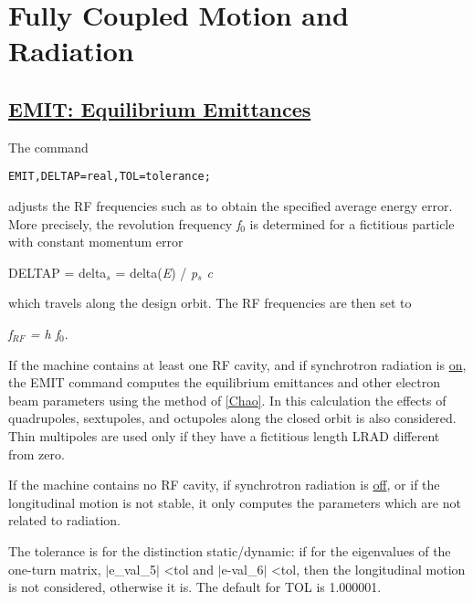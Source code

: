 





\section{Fully Coupled Motion and Radiation}

\subsection{\href{emit}{EMIT: Equilibrium Emittances}} The command 
\begin{verbatim}
EMIT,DELTAP=real,TOL=tolerance;
\end{verbatim} adjusts the RF frequencies such as to obtain the specified average energy error. More precisely, the revolution frequency \textit{f$_0$} is determined for a fictitious particle with constant momentum error 

 DELTAP = delta$_\textit{s}$ = delta(\textit{E}) / \textit{p$_s$ c}

 which travels along the design orbit. The RF frequencies are then set to 

\textit{f$_{RF}$ = h f$_0$}. 

 If the machine contains at least one RF cavity, and if synchrotron radiation is \href{../Introduction/beam.html#radiate}{on}, the EMIT command computes the equilibrium emittances and other electron beam parameters using the method of \href{../Introduction/bibliography.html#chao}{[Chao]}. In this calculation the effects of quadrupoles, sextupoles, and octupoles along the closed orbit is also considered. Thin multipoles are used only if they have a fictitious length LRAD  different from zero. 

 If the machine contains no RF cavity, if synchrotron radiation is  \href{../Introduction/beam.html#radiate}{off}, or if the longitudinal motion is not stable, it only computes the parameters which are not related to radiation. 

 The tolerance is for the distinction static/dynamic: if for the eigenvalues of the one-turn matrix, $|$e\_val\_5$|$ \textless tol and $|$e-val\_6$|$ \textless tol, then the longitudinal motion is not considered, otherwise it is. The default for TOL is 1.000001. 
 
